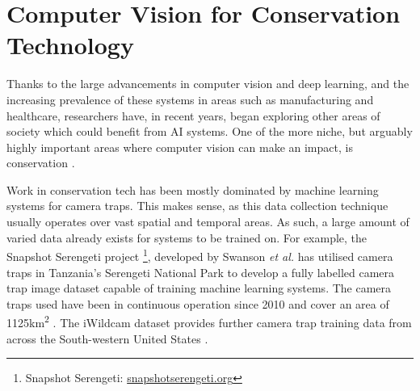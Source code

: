 \section{Computer Vision for Conservation Technology}\label{ch:Background,sec:conTech}

Thanks to the large advancements in computer vision and deep learning, and the increasing prevalence of these systems in areas such as manufacturing and healthcare, researchers have, in recent years, began exploring other areas of society which could benefit from AI systems. One of the more niche, but arguably highly important areas where computer vision can make an impact, is conservation \cite{weinstein_computer_2018}.

Work in conservation tech has been mostly dominated by machine learning systems for camera traps. This makes sense, as this data collection technique usually operates over vast spatial and temporal areas. As such, a large amount of varied data already exists for systems to be trained on. For example, the Snapshot Serengeti project \footnote{Snapshot Serengeti: \href{https://www.snapshotserengeti.org/}{snapshotserengeti.org}}, developed by Swanson \textit{et al.} has utilised camera traps in Tanzania's Serengeti National Park to develop a fully labelled camera trap image dataset capable of training machine learning systems. The camera traps used have been in continuous operation since 2010 and cover an area of 1125km\textsuperscript{2} \cite{swanson_snapshot_2015}. The iWildcam dataset provides further camera trap training data from across the South-western United States \cite{beery_iwildcam_2019}.

